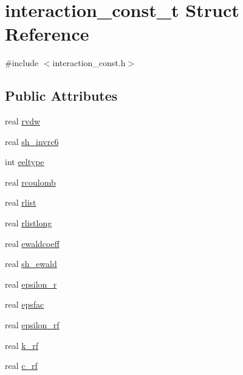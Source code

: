 \hypertarget{structinteraction__const__t}{\section{interaction\-\_\-const\-\_\-t \-Struct \-Reference}
\label{structinteraction__const__t}
}


{\ttfamily \#include $<$interaction\-\_\-const.\-h$>$}

\subsection*{\-Public \-Attributes}
\begin{DoxyCompactItemize}
\item 
real \hyperlink{structinteraction__const__t_ac6eab0128e9bfceef1c3e797811b98e6}{rvdw}
\item 
real \hyperlink{structinteraction__const__t_afc3c12cde38493bb9a7d6496b5a62006}{sh\-\_\-invrc6}
\item 
int \hyperlink{structinteraction__const__t_ad5b2cdabd004cc9b1c23f23456049633}{eeltype}
\item 
real \hyperlink{structinteraction__const__t_abf984a04e33f4adb2295c492966fc137}{rcoulomb}
\item 
real \hyperlink{structinteraction__const__t_a27c2aa7139e4cda0b1b7cb686b3ca842}{rlist}
\item 
real \hyperlink{structinteraction__const__t_ac0e35f45cca54fd31791459cf6a2120b}{rlistlong}
\item 
real \hyperlink{structinteraction__const__t_a40c381ec9200f3a67677aaea98b95259}{ewaldcoeff}
\item 
real \hyperlink{structinteraction__const__t_a5769130b5b046d4c8bd913e9c78627de}{sh\-\_\-ewald}
\item 
real \hyperlink{structinteraction__const__t_a331f0af8288de99f4d1197310cd4c457}{epsilon\-\_\-r}
\item 
real \hyperlink{structinteraction__const__t_a17027bcec280cb44a96fad4a09968464}{epsfac}
\item 
real \hyperlink{structinteraction__const__t_a5da441d4fb18f0d55fdbd2e78a49f851}{epsilon\-\_\-rf}
\item 
real \hyperlink{structinteraction__const__t_a15ec042ee96e5da3f3d0db6e1548df53}{k\-\_\-rf}
\item 
real \hyperlink{structinteraction__const__t_a3992f3695c023a92de54dea9b5a70118}{c\-\_\-rf}
\item 

\end{DoxyCompactItemize}
